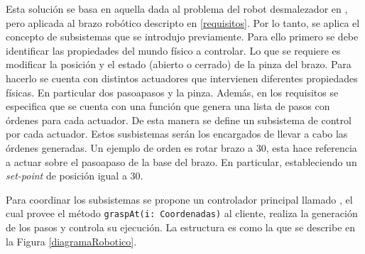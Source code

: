 Esta solución se basa en aquella dada al problema del robot desmalezador en \cite{paperPomponio}, pero aplicada al brazo robótico descripto en \ref{requisitos}. Por lo tanto, se aplica el concepto de subsistemas que se introdujo previamente. Para ello primero se debe identificar las propiedades del mundo físico a controlar. Lo que se requiere es modificar la posición y el estado (abierto o cerrado) de la pinza del brazo. Para hacerlo se cuenta con distintos actuadores que intervienen diferentes propiedades físicas. En particular dos \glspl{pasoapaso} y la pinza. Además, en los requisitos se especifica que se cuenta con una función que genera una lista de pasos con órdenes para cada actuador. De esta manera se define un subsistema de control por cada actuador. Estos susbistemas serán los encargados de llevar a cabo las órdenes generadas. Un ejemplo de orden es rotar brazo a 30\textdegree, esta hace referencia a actuar sobre el \gls{pasoapaso} de la base del brazo. En particular, estableciendo un \textit{set-point} de posición igual a 30\textdegree. 


Para coordinar los subsistemas se propone un controlador principal llamado \MainController, el cual provee el método \verb|graspAt(i: Coordenadas)| al cliente, realiza la generación de los pasos y controla su ejecución. La estructura es como la que se describe en la Figura \ref{diagramaRobotico}.


